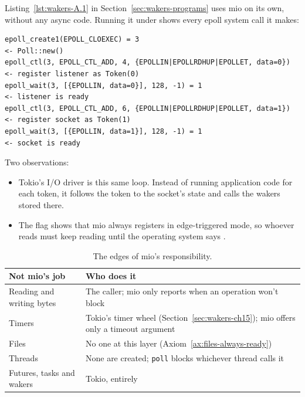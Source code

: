 Listing~\ref{lst:wakers-A.1} in Section~\ref{sec:wakers-programs} uses mio on its own, without any async code. Running it under  shows every epoll system call it makes:

\begin{lstlisting}[language={}, numbers=none, caption={The epoll system calls made by Listing~\ref{lst:wakers-A.1}. Each token comes back in epoll's \texttt{data} field.}, label=lst:wakers-12.1]
epoll_create1(EPOLL_CLOEXEC) = 3                                      <- Poll::new()
epoll_ctl(3, EPOLL_CTL_ADD, 4, {EPOLLIN|EPOLLRDHUP|EPOLLET, data=0})  <- register listener as Token(0)
epoll_wait(3, [{EPOLLIN, data=0}], 128, -1) = 1                       <- listener is ready
epoll_ctl(3, EPOLL_CTL_ADD, 6, {EPOLLIN|EPOLLRDHUP|EPOLLET, data=1})  <- register socket as Token(1)
epoll_wait(3, [{EPOLLIN, data=1}], 128, -1) = 1                       <- socket is ready
\end{lstlisting}

Two observations:

\begin{itemize}
    \item Tokio's I/O driver is this same loop. Instead of running application code for each token, it follows the token to the socket's state and calls the wakers stored there.
    \item The  flag shows that mio always registers in edge-triggered mode, so whoever reads must keep reading until the operating system says .
\end{itemize}

\begin{table}[htbp]
    \centering\small
    \begin{tabularx}{\linewidth}{>{\raggedright\arraybackslash}p{4.4cm} Y}
        \toprule
        \textbf{Not mio's job} & \textbf{Who does it} \\
        \midrule
        Reading and writing bytes & The caller; mio only reports when an operation won't block \\
        Timers & Tokio's timer wheel (Section~\ref{sec:wakers-ch15}); mio offers only a timeout argument \\
        Files & No one at this layer (Axiom~\ref{ax:files-always-ready}) \\
        Threads & None are created; \texttt{poll} blocks whichever thread calls it \\
        Futures, tasks and wakers & Tokio, entirely \\
        \bottomrule
    \end{tabularx}
    \caption{The edges of mio's responsibility.}
    \label{tab:wakers-12.1}
\end{table}

